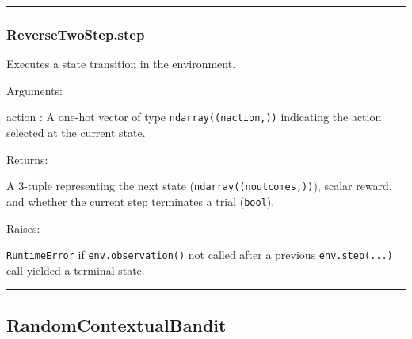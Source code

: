 \begin{Shaded}
\begin{Highlighting}[]
\OperatorTok{=}
\end{Highlighting}
\end{Shaded}

\begin{center}\rule{0.5\linewidth}{\linethickness}\end{center}

\subsubsection{ReverseTwoStep.step}\label{reversetwostep.step}

\begin{Shaded}
\begin{Highlighting}[]
\end{Highlighting}
\end{Shaded}

Executes a state transition in the environment.

Arguments:

action : A one-hot vector of type \texttt{ndarray((naction,))}
indicating the action selected at the current state.

Returns:

A 3-tuple representing the next state (\texttt{ndarray((noutcomes,))}),
scalar reward, and whether the current step terminates a trial
(\texttt{bool}).

Raises:

\texttt{RuntimeError} if \texttt{env.observation()} not called after a
previous \texttt{env.step(...)} call yielded a terminal state.

\begin{center}\rule{0.5\linewidth}{\linethickness}\end{center}

\subsection{RandomContextualBandit}\label{randomcontextualbandit}

\begin{Shaded}
\begin{Highlighting}[]
\end{Highlighting}
\end{Shaded}

